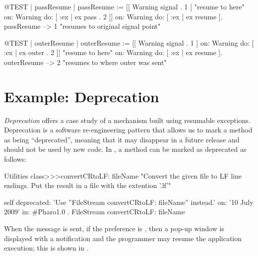\documentclass[a4paper,10pt,twoside]{book}
\begin{document}
\begin{code}{@TEST | passResume |}
passResume := [[ Warning signal . 1 ]    "resume to here"
	on: Warning
	do: [ :ex | ex pass . 2 ]]
		on: Warning
		do: [ :ex | ex resume ].
passResume --> 1    "resumes to original signal point"
\end{code}

\begin{code}{@TEST | outerResume |}
outerResume := [[ Warning signal . 1 ]
	on: Warning
	do: [ :ex | ex outer . 2 ]]    "resume to here"
		on: Warning
		do: [ :ex | ex resume ].
outerResume --> 2    "resumes to where outer was sent"
\end{code}

\section{Example: Deprecation}
\emph{Deprecation} offers a case study of a mechanism built using resumable exceptions.
Deprecation is a software re-engineering pattern that allows us to mark a method as being ``deprecated'', meaning that it may disappear in a future release and should not be used by new code.
In \pharo, a method can be marked as deprecated as follows:

\begin{code}{}
Utilities class>>>convertCRtoLF: fileName
	"Convert the given file to LF line endings. Put the result in a file with the extention '.lf'"

	self deprecated: 'Use ''FileStream convertCRtoLF: fileName'' instead.' 
		on: '10 July 2009' in: #Pharo1.0 .
	FileStream convertCRtoLF: fileName
\end{code}

When the message  is sent, if the  preference is  , then a pop-up window is displayed with a notification and the programmer may resume the application execution; this is shown in .
\end{document}
